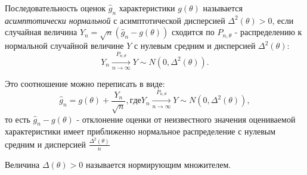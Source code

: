 \begin{definition}
	Последовательность оценок $\hat{g}_n$ характеристики $g(\theta)$ называется \textit{асимптотически нормальной} с асимптотической дисперсией $\Delta^2(\theta) > 0$, если случайная величина $Y_n = \sqrt{n}(\hat{g}_n - g(\theta))$ сходится по $P_{n, \theta}$ - распределению к нормальной случайной величине $Y$ с нулевым средним и дисперсией $\Delta^2(\theta)$:
  \[
    Y_n \xrightarrow[n \to \infty]{P_{n, \theta}} Y \sim N(0, \Delta^2(\theta))
  .\]
\end{definition}

Это соотношение можно переписать в виде:
\[
  \hat{g}_n = g(\theta) + \frac{Y_n}{\sqrt{n}}, где Y_n \xrightarrow[n \to \infty]{P_{n, \theta}} Y \sim N(0, \Delta^2(\theta))
,\]
то есть
$\hat{g}_n - g(\theta)$ - отклонение оценки от неизвестного значения оцениваемой характеристики имеет приближенно нормальное распределение с нулевым средним и дисперсией $\frac{\Delta^2(\theta)}{n}$

\begin{definition}
  Величина $\Delta(\theta) > 0$ называется нормирующим множителем.
\end{definition}

